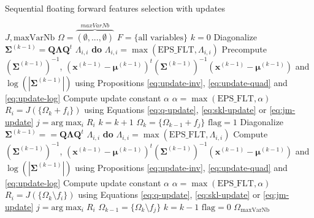 \documentclass[journal]{IEEEtran}
\begin{document}
    \begin{algorithm}
    \caption{Sequential floating forward features selection with updates\label{alg:sffs-update}}
    {\footnotesize
    \begin{algorithmic}[1]
    \REQUIRE $J,\text{maxVarNb}$
    \STATE $\Omega=\overbrace{(\emptyset,...,\emptyset)}^{maxVarNb}$
    \STATE $F=\text{\{all variables\}}$
    \STATE $k=0$
    \STATE Diagonalize $\boldsymbol{\Sigma}^{(k-1)} = \mathbf{Q} \boldsymbol{\Lambda} \mathbf{Q}^t$
     $\Lambda_{i,i}$ {\bfseries do} $\Lambda_{i,i} = \max (\text{EPS\_FLT},\Lambda_{i,i})$
    \STATE Precompute {\scriptsize $(\boldsymbol{\Sigma}^{(k-1)})^{-1}$, $(\mathbf{x}^{(k-1)} - \boldsymbol{\mu}^{(k-1)})^t (\boldsymbol{\Sigma}^{(k-1)})^{-1} (\mathbf{x}^{(k-1)}- \boldsymbol{\mu}^{(k-1)})$ and $\log \left(|\boldsymbol{\Sigma}^{(k-1)}|\right)$} using Propositions \ref{eq:update-inv}, \ref{eq:update-quad} and \ref{eq:update-log}
    \STATE Compute update constant $\alpha$
    \STATE $\alpha = \max (\text{EPS\_FLT},\alpha)$
    \STATE $R_i = J(\{\Omega_k + f_i\})$ using Equations \ref{eq:q-update}, \ref{eq:skl-update} or \ref{eq:jm-update}
    \ENDFOR
    \STATE $j=\text{arg} \max_{i} R_i$
    \STATE $k=k+1$
    \STATE $\Omega_k = \{\Omega_{k-1} + f_j\}$
    \STATE $\text{flag}=1$
    \STATE Diagonalize $\boldsymbol{\Sigma}^{(k-1)} = = \mathbf{Q} \boldsymbol{\Lambda} \mathbf{Q}^t$
     $\Lambda_{i,i}$ {\bfseries do} $\Lambda_{i,i} = \max (\text{EPS\_FLT},\Lambda_{i,i})$
    \STATE Compute {\scriptsize $(\boldsymbol{\Sigma}^{(k-1)})^{-1}$, $(\mathbf{x}^{(k-1)} - \boldsymbol{\mu}^{(k-1)})^t (\boldsymbol{\Sigma}^{(k-1)})^{-1} (\mathbf{x}^{(k-1)}- \boldsymbol{\mu}^{(k-1)})$ and $\log \left(|\boldsymbol{\Sigma}^{(k-1)}|\right)$} using Propositions \ref{eq:update-inv}, \ref{eq:update-quad} and \ref{eq:update-log}
    \STATE Compute update constant $\alpha$
    \STATE $\alpha = \max (\text{EPS\_FLT},\alpha)$
    \STATE $R_i = J(\{\Omega_k \setminus f_i\})$ using Equations \ref{eq:q-update}, \ref{eq:skl-update} or \ref{eq:jm-update}
    \ENDFOR
    \STATE $j=\text{arg} \max_{i} R_i$
    \STATE $\Omega_{k-1} = \{\Omega_k \setminus f_j\}$
    \STATE $k=k-1$
    \ELSE
    \STATE $\text{flag}=0$
    \ENDIF
    \ENDWHILE
    \ENDIF
    \ENDWHILE
    \RETURN $\Omega_{\text{maxVarNb}}$
    \end{algorithmic}
    }
    \end{algorithm}
\end{document}

